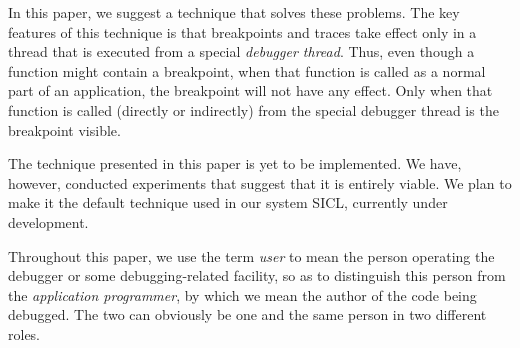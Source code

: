 In this paper, we suggest a technique that solves these problems.  The
key features of this technique is that breakpoints and traces take
effect only in a thread that is executed from a special \emph{debugger
  thread}.  Thus, even though a function might contain a breakpoint,
when that function is called as a normal part of an application, the
breakpoint will not have any effect.  Only when that function is
called (directly or indirectly) from the special debugger thread is
the breakpoint visible.

The technique presented in this paper is yet to be implemented.  We
have, however, conducted experiments that suggest that it is entirely
viable.  We plan to make it the default technique used in our system
SICL, currently under development.

Throughout this paper, we use the term \emph{user} to mean the person
operating the debugger or some debugging-related facility, so as to
distinguish this person from the \emph{application programmer}, by
which we mean the author of the code being debugged.  The two can
obviously be one and the same person in two different roles.
